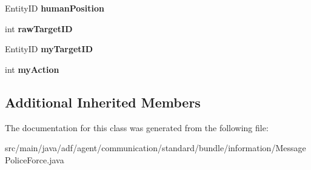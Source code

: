 \begin{DoxyCompactItemize}
Entity\+ID {\bfseries human\+Position}
\item 
\hypertarget{classadf_1_1agent_1_1communication_1_1standard_1_1bundle_1_1information_1_1MessagePoliceForce_a217cbd77bc507a5085e73ab5615c1200}{}\label{classadf_1_1agent_1_1communication_1_1standard_1_1bundle_1_1information_1_1MessagePoliceForce_a217cbd77bc507a5085e73ab5615c1200} 
int {\bfseries raw\+Target\+ID}
\item 
\hypertarget{classadf_1_1agent_1_1communication_1_1standard_1_1bundle_1_1information_1_1MessagePoliceForce_a3a8e395c0f856d483352ef8fb399159f}{}\label{classadf_1_1agent_1_1communication_1_1standard_1_1bundle_1_1information_1_1MessagePoliceForce_a3a8e395c0f856d483352ef8fb399159f} 
Entity\+ID {\bfseries my\+Target\+ID}
\item 
\hypertarget{classadf_1_1agent_1_1communication_1_1standard_1_1bundle_1_1information_1_1MessagePoliceForce_a30763f7e77021d0f06c6bf30d698cae9}{}\label{classadf_1_1agent_1_1communication_1_1standard_1_1bundle_1_1information_1_1MessagePoliceForce_a30763f7e77021d0f06c6bf30d698cae9} 
int {\bfseries my\+Action}
\end{DoxyCompactItemize}
\subsection*{Additional Inherited Members}


The documentation for this class was generated from the following file\+:\begin{DoxyCompactItemize}
\item 
src/main/java/adf/agent/communication/standard/bundle/information/Message\+Police\+Force.\+java\end{DoxyCompactItemize}
